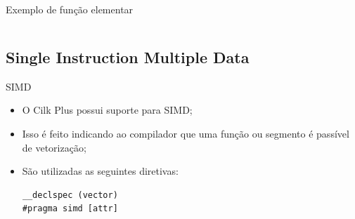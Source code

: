 \documentclass{beamer}
\begin{document}
\begin{frame}{Exemplo de função elementar}
\begin{columns}


\end{columns}

\end{frame}

\subsection{Single Instruction Multiple Data}
\begin{frame}[fragile]{SIMD}
\begin{itemize}
     \item O Cilk Plus possui suporte para SIMD;
     \item Isso é feito indicando ao compilador que uma função ou segmento é
     passível de vetorização;
     \item São utilizadas as seguintes diretivas:

\begin{lstlisting}[deletekeywords={vector}]
__declspec (vector)
#pragma simd [attr]
\end{lstlisting}
\end{itemize}
\end{frame}
\end{document}
